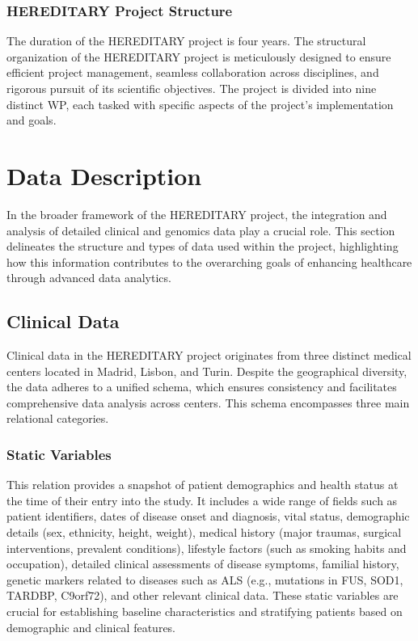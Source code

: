 \subsubsection{HEREDITARY Project Structure}
The duration of the \ac{HEREDITARY} project is four years. The structural organization of the \ac{HEREDITARY} project is meticulously designed to ensure efficient project management, seamless collaboration across disciplines, and rigorous pursuit of its scientific objectives. The project is divided into nine distinct \ac{WP}, each tasked with specific aspects of the project's implementation and goals.

\section{Data Description}
In the broader framework of the \ac{HEREDITARY} project, the integration and analysis of detailed clinical and genomics data play a crucial role. This section delineates the structure and types of data used within the project, highlighting how this information contributes to the overarching goals of enhancing healthcare through advanced data analytics.
\subsection{Clinical Data}
Clinical data in the \ac{HEREDITARY} project originates from three distinct medical centers located in Madrid, Lisbon, and Turin. Despite the geographical diversity, the data adheres to a unified schema, which ensures consistency and facilitates comprehensive data analysis across centers. This schema encompasses three main relational categories.
\subsubsection{Static Variables}
This relation provides a snapshot of patient demographics and health status at the time of their entry into the study. It includes a wide range of fields such as patient identifiers, dates of disease onset and diagnosis, vital status, demographic details (sex, ethnicity, height, weight), medical history (major traumas, surgical interventions, prevalent conditions), lifestyle factors (such as smoking habits and occupation), detailed clinical assessments of disease symptoms, familial history, genetic markers related to diseases such as \ac{ALS} (e.g., mutations in FUS, SOD1, TARDBP, C9orf72), and other relevant clinical data. These static variables are crucial for establishing baseline characteristics and stratifying patients based on demographic and clinical features.
